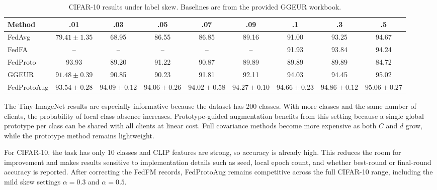 ﻿\documentclass[conference]{IEEEtran}
\newcommand{\method}{FedProtoAug}
\newcommand{\clip}{CLIP}
\begin{document}
\begin{table}[t]
\centering
\caption{CIFAR-10 results under label skew. Baselines are from the provided GGEUR workbook.}
\label{tab:cifar10}
\begin{tabular}{lcccccccc}
\toprule
Method & .01 & .03 & .05 & .07 & .09 & .1 & .3 & .5 \\
\midrule
FedAvg & $79.41\pm1.35$ & 68.95 & 86.55 & 86.85 & 89.16 & 91.00 & 93.25 & 94.67 \\
FedFA & -- & -- & -- & -- & -- & 91.93 & 93.84 & 94.24 \\
FedProto & 93.93 & 89.20 & 91.22 & 90.87 & 89.89 & 89.89 & 89.89 & 84.72 \\
GGEUR & $91.48\pm0.39$ & 90.85 & 90.23 & 91.81 & 92.11 & 94.03 & 94.45 & 95.02 \\
\method{} & $93.54\pm0.28$ & $94.09\pm0.12$ & $94.06\pm0.26$ & $94.02\pm0.58$ & $94.27\pm0.10$ & $94.66\pm0.23$ & $94.86\pm0.12$ & $95.06\pm0.27$ \\
\bottomrule
\end{tabular}
\end{table}

The Tiny-ImageNet results are especially informative because the dataset has 200 classes. With more classes and the same number of clients, the probability of local class absence increases. Prototype-guided augmentation benefits from this setting because a single global prototype per class can be shared with all clients at linear cost. Full covariance methods become more expensive as both $C$ and $d$ grow, while the prototype method remains lightweight.

For CIFAR-10, the task has only 10 classes and \clip{} features are strong, so accuracy is already high. This reduces the room for improvement and makes results sensitive to implementation details such as seed, local epoch count, and whether best-round or final-round accuracy is reported. After correcting the FedFM records, \method{} remains competitive across the full CIFAR-10 range, including the mild skew settings $\alpha = 0.3$ and $\alpha = 0.5$.
\end{document}
